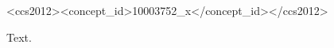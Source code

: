\documentclass{lipics-v2019}
\begin{document}
\begin{CCSXML}
<ccs2012><concept_id>10003752_x</concept_id></ccs2012>
\end{CCSXML}
Text.\makeatletter{}\makeatother
\end{document}
